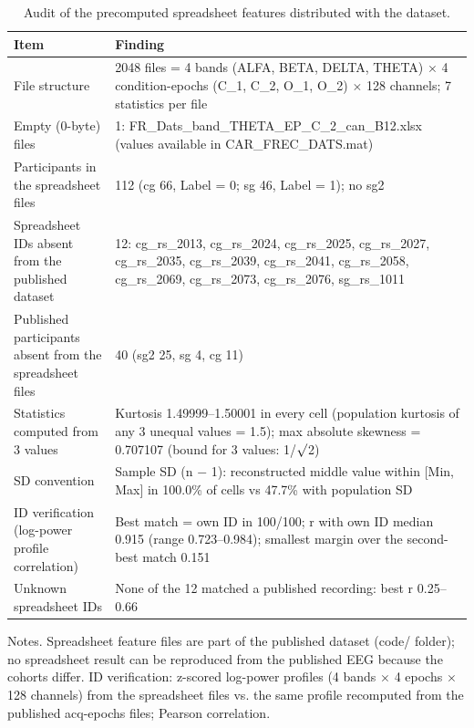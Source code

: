 \begin{table}[htbp]
\centering
\caption{Audit of the precomputed spreadsheet features distributed with the dataset.}
\label{tab:TableS5}
\footnotesize
\begin{tabular}{p{3.5cm}p{11.0cm}}
\toprule
Item & Finding \\
\midrule
File structure & 2048 files = 4 bands (ALFA, BETA, DELTA, THETA) $\times$ 4 condition-epochs (C\_1, C\_2, O\_1, O\_2) $\times$ 128 channels; 7 statistics per file \\
Empty (0-byte) files & 1: FR\_Dats\_band\_THETA\_EP\_C\_2\_can\_B12.xlsx (values available in CAR\_FREC\_DATS.mat) \\
Participants in the spreadsheet files & 112 (cg 66, Label = 0; sg 46, Label = 1); no sg2 \\
Spreadsheet IDs absent from the published dataset & 12: cg\_rs\_2013, cg\_rs\_2024, cg\_rs\_2025, cg\_rs\_2027, cg\_rs\_2035, cg\_rs\_2039, cg\_rs\_2041, cg\_rs\_2058, cg\_rs\_2069, cg\_rs\_2073, cg\_rs\_2076, sg\_rs\_1011 \\
Published participants absent from the spreadsheet files & 40 (sg2 25, sg 4, cg 11) \\
Statistics computed from 3 values & Kurtosis 1.49999--1.50001 in every cell (population kurtosis of any 3 unequal values = 1.5); max absolute skewness = 0.707107 (bound for 3 values: 1/$\surd$2) \\
SD convention & Sample SD (n $-$ 1): reconstructed middle value within [Min, Max] in 100.0\% of cells vs 47.7\% with population SD \\
ID verification (log-power profile correlation) & Best match = own ID in 100/100; r with own ID median 0.915 (range 0.723--0.984); smallest margin over the second-best match 0.151 \\
Unknown spreadsheet IDs & None of the 12 matched a published recording: best r 0.25--0.66 \\
\bottomrule
\end{tabular}
\par\smallskip
\begin{minipage}{\textwidth}\raggedright\scriptsize
Notes. Spreadsheet feature files are part of the published dataset (code/ folder); no spreadsheet result can be reproduced from the published EEG because the cohorts differ. ID verification: z-scored log-power profiles (4 bands $\times$ 4 epochs $\times$ 128 channels) from the spreadsheet files vs. the same profile recomputed from the published acq-epochs files; Pearson correlation.
\end{minipage}
\end{table}
